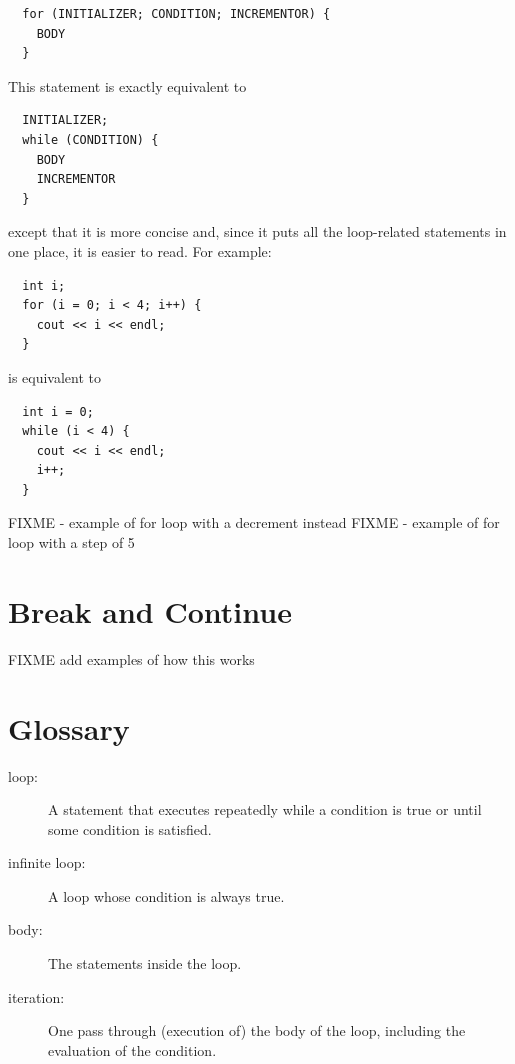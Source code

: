 \begin{verbatim}
  for (INITIALIZER; CONDITION; INCREMENTOR) {
    BODY
  }
\end{verbatim}
%
This statement is exactly equivalent to

\begin{verbatim}
  INITIALIZER;
  while (CONDITION) {
    BODY
    INCREMENTOR
  }
\end{verbatim}
%
except that it is more concise and, since it puts all the
loop-related statements in one place, it is easier to read.
For example:

\begin{verbatim}
  int i;
  for (i = 0; i < 4; i++) {
    cout << i << endl;
  }
\end{verbatim}
%
is equivalent to 

\begin{verbatim}
  int i = 0;
  while (i < 4) {
    cout << i << endl;
    i++;
  }
\end{verbatim}

FIXME - example of for loop with a decrement instead
FIXME - example of for loop with a step of 5

\section{Break and Continue}
FIXME add examples of how this works
\section{Glossary}

\begin{description}

\item[loop:]  A statement that executes repeatedly while a
condition is true or until some condition is satisfied.

\item[infinite loop:]  A loop whose condition is always true.

\item[body:]  The statements inside the loop.

\item[iteration:]  One pass through (execution of) the body
of the loop, including the evaluation of the condition.




\end{description}

